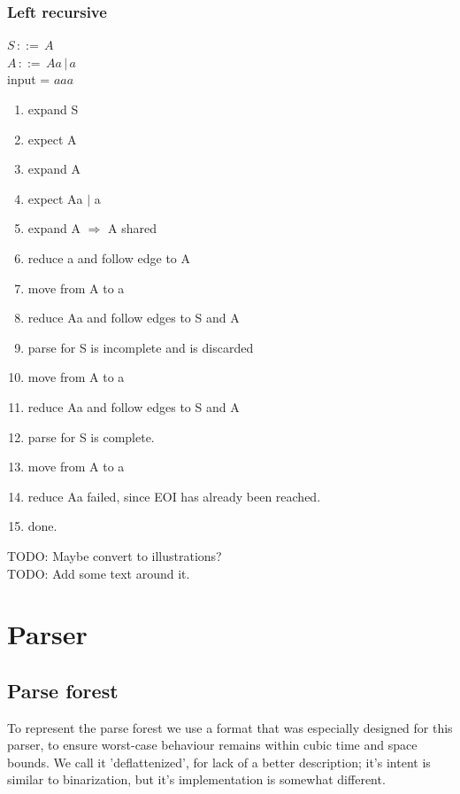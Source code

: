 \documentclass[a4paper,10pt]{article}
\begin{document}
\subsubsection{Left recursive}
$S\,::=\,A$\\
$A\,::=\,Aa\,|\,a$\\
input = $aaa$

\begin{enumerate}
 \setlength{\itemsep}{0pt}
 \setlength{\parskip}{0pt}
 \setlength{\parsep}{0pt}
 
 \item expand S
 \item expect A
 \item expand A
 \item expect Aa $|$ a
 \item expand A $\Rightarrow$ A shared
 \item reduce a and follow edge to A
 \item move from A to a
 \item reduce Aa and follow edges to S and A
 \item parse for S is incomplete and is discarded
 \item move from A to a
 \item reduce Aa and follow edges to S and A
 \item parse for S is complete.
 \item move from A to a
 \item reduce Aa failed, since EOI has already been reached.
 \item done.
\end{enumerate}

TODO: Maybe convert to illustrations?\\
TODO: Add some text around it.

\section{Parser}

\subsection{Parse forest}

To represent the parse forest we use a format that was especially designed for this parser, to ensure worst-case behaviour remains within cubic time and space bounds. We call it 'deflattenized', for lack of a better description; it's intent is similar to binarization, but it's implementation is somewhat different.
\end{document}
